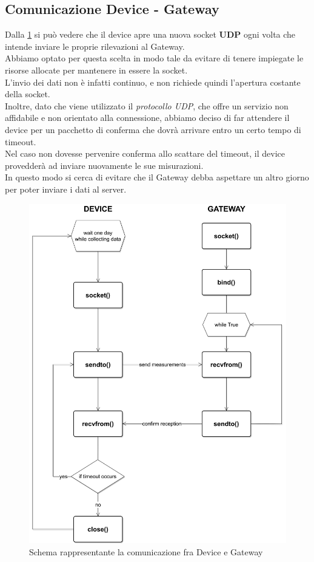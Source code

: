 \documentclass[a4paper,12pt]{report}
\begin{document}
\subsection{Comunicazione Device - Gateway}
Dalla \cref{img:DeviceGateway} si può vedere che il device apre una nuova socket \textbf{UDP} ogni volta che intende inviare le proprie rilevazioni al Gateway. \\
Abbiamo optato per questa scelta in modo tale da evitare di tenere impiegate le risorse allocate per mantenere in essere la socket.\\L'invio dei dati non è infatti continuo, e non richiede quindi l'apertura costante della socket.\\ Inoltre, dato che viene utilizzato il \textit{protocollo UDP}, che offre un servizio non affidabile e non orientato alla connessione, abbiamo deciso di far attendere il device per un pacchetto di conferma che dovrà arrivare entro un certo tempo di timeout.\\Nel caso non dovesse pervenire conferma allo scattare del timeout, il device provedderà ad inviare nuovamente le sue misurazioni.\\
In questo modo si cerca di evitare che il Gateway debba aspettare un altro giorno per poter inviare i dati al server.
\begin{figure}[H]
    \begin{center}
        \centering
        \includegraphics[scale=0.35]{UML/DeviceGateway.png}
    \end{center}
    \caption{Schema rappresentante la comunicazione fra Device e Gateway}
    \label{img:DeviceGateway}
\end{figure}
\
\\
%
\end{document}
